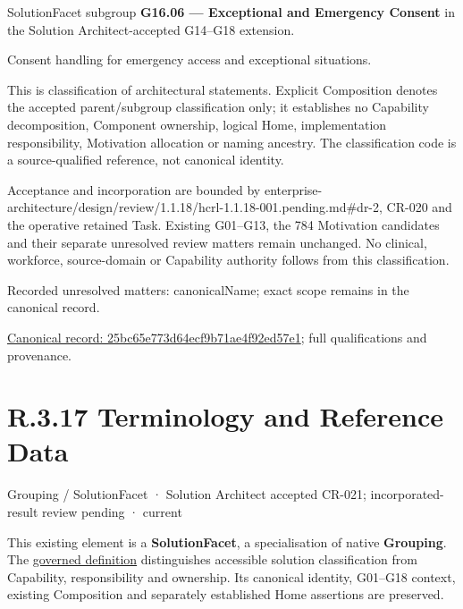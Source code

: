 SolutionFacet subgroup \textbf{G16.06 — Exceptional and Emergency Consent} in the Solution Architect-accepted G14–G18 extension.



Consent handling for emergency access and exceptional situations.



This is classification of architectural statements. Explicit Composition denotes the accepted parent/subgroup classification only; it establishes no Capability decomposition, Component ownership, logical Home, implementation responsibility, Motivation allocation or naming ancestry. The classification code is a source-qualified reference, not canonical identity.



Acceptance and incorporation are bounded by enterprise-architecture/design/review/1.1.18/hcrl-1.1.18-001.pending.md\#dr-2, CR-020 and the operative retained Task. Existing G01–G13, the 784 Motivation candidates and their separate unresolved review matters remain unchanged. No clinical, workforce, source-domain or Capability authority follows from this classification.


{\small Recorded unresolved matters: canonicalName; exact scope remains in the canonical record.}\par
{\footnotesize \href{../../../../../../../continuum/grouping/25bc65e773d64ecf9b71ae4f92ed57e1.md}{Canonical record: 25bc65e773d64ecf9b71ae4f92ed57e1}; full qualifications and provenance.}\par
\section*{R.3.17 Terminology and Reference Data}
\label{navigation:R.3.17}

\label{element:8b27323cbaba400698842f77e0d28c0d}
{\small Grouping / SolutionFacet · Solution Architect accepted CR-021; incorporated-result review pending · current}\par

This existing element is a \textbf{SolutionFacet}, a specialisation of native
\textbf{Grouping}. The \href{\detokenize{../../../../../../../governance/continuum-representation.md#solutionfacet-classification--1119-candidate}}{governed definition}
distinguishes accessible solution classification from Capability, responsibility
and ownership. Its canonical identity, G01–G18 context, existing Composition
and separately established Home assertions are preserved.



